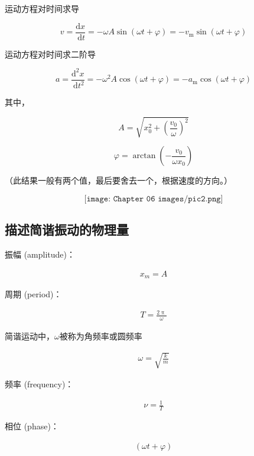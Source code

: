 \documentclass[
	12pt, %
	a4paper, %
]{myLegrandOrangeBook}
\begin{document}
    运动方程对时间求导

    \begin{equation}
        v=\frac{\mathrm{d} x}{\mathrm{~d} t}=-\omega A \sin (\omega t+\varphi)=-v_{\mathrm{m}} \sin (\omega t+\varphi)
    \end{equation}

    运动方程对时间求二阶导

    \begin{equation}
        a=\frac{\mathrm{d}^2 x}{\mathrm{~d} t^2}=-\omega^2 A \cos (\omega t+\varphi)=
        -a_{\mathrm{m}} \cos (\omega t+\varphi)
    \end{equation}

    其中，

    $$
        A=\sqrt{x_0^2+\left(\frac{v_0}{\omega}\right)^2}
    $$

    $$
        \varphi=\arctan \left(-\frac{v_0}{\omega x_0}\right)
    $$

    （此结果一般有两个值，最后要舍去一个，根据速度的方向。）
    
    \[
        \texttt{[image: Chapter 06 images/pic2.png]}
    \]

\subsection{描述简谐振动的物理量}

    振幅 (amplitude)：

    \begin{align}
        x_m = A
    \end{align}

    周期 (period)：

    \begin{align}
        T = \frac{2 \uppi}{\omega}
    \end{align}

    简谐运动中，\(\omega\)被称为角频率或圆频率

    \begin{align}
        \omega = \sqrt{\frac{k}{m}}
    \end{align}

    频率 (frequency)：

    \begin{align}
        \nu = \frac{1}{T}
    \end{align}

    相位 (phase)：

    \begin{align}
        \left(\omega t + \varphi\right)
    \end{align}
\end{document}
